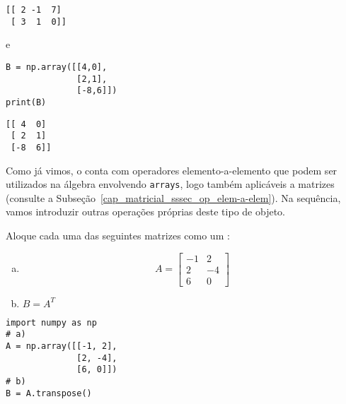 \begin{verbatim}
[[ 2 -1  7]
 [ 3  1  0]]
\end{verbatim}

e

\begin{lstlisting}
B = np.array([[4,0],
              [2,1],
              [-8,6]])
print(B)
\end{lstlisting}

\begin{verbatim}
[[ 4  0]
 [ 2  1]
 [-8  6]]
\end{verbatim}

Como já vimos, o {\numpy} conta com operadores elemento-a-elemento que podem ser utilizados na álgebra envolvendo \texttt{arrays}, logo também aplicáveis a matrizes (consulte a Subseção~\ref{cap_matricial_sssec_op_elem-a-elem}). Na sequência, vamos introduzir outras operações próprias deste tipo de objeto.

\begin{exer}
  Aloque cada uma das seguintes matrizes como um {\PYTHONnumpyDOTarray}:
  \begin{enumerate}[a)]
  \item
    \begin{equation}
      A =
      \begin{bmatrix}
        -1 & 2\\
        2 & -4\\
        6 & 0
      \end{bmatrix}
    \end{equation}
  \item $B = A^T$ 
  \end{enumerate}
\end{exer}
\begin{resp}

\begin{lstlisting}
import numpy as np
# a)
A = np.array([[-1, 2],
              [2, -4],
              [6, 0]])
# b)
B = A.transpose()
\end{lstlisting}

\end{resp}

